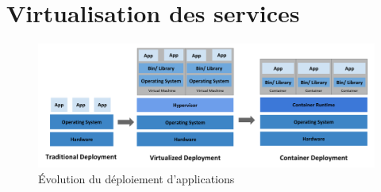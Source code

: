 \section{Virtualisation des services}

\begin{figure}[H]
    \centering
    \includegraphics[width=\textwidth]{./img/container_evolution.png}
    \caption{Évolution du déploiement d'applications \cite{shavidissa2019}}
    \label{fig:container_evolution}
\end{figure}
